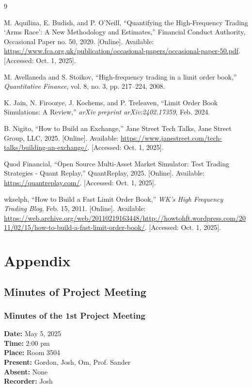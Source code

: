 \documentclass[12pt,a4paper]{article}
\begin{document}
\begin{thebibliography}{9}

M. Aquilina, E. Budish, and P. O’Neill, ``Quantifying the High-Frequency Trading `Arms Race': A New Methodology and Estimates,'' Financial Conduct Authority, Occasional Paper no. 50, 2020. [Online]. Available: \url{https://www.fca.org.uk/publication/occasional-papers/occasional-paper-50.pdf}. [Accessed: Oct. 1, 2025].

M. Avellaneda and S. Stoikov, ``High-frequency trading in a limit order book,'' \textit{Quantitative Finance}, vol. 8, no. 3, pp. 217--224, 2008.

K. Jain, N. Firoozye, J. Kochems, and P. Treleaven, ``Limit Order Book Simulations: A Review,'' \textit{arXiv preprint arXiv:2402.17359}, Feb. 2024.

B. Nigito, ``How to Build an Exchange,'' Jane Street Tech Talks, Jane Street Group, LLC, 2025. [Online]. Available: \url{https://www.janestreet.com/tech-talks/building-an-exchange/}. [Accessed: Oct. 1, 2025].

Quod Financial, ``Open Source Multi-Asset Market Simulator: Test Trading Strategies - Quant Replay,'' QuantReplay, 2025. [Online]. Available: \url{https://quantreplay.com/}. [Accessed: Oct. 1, 2025].

wkselph, ``How to Build a Fast Limit Order Book,'' \textit{WK's High Frequency Trading Blog}, Feb. 15, 2011. [Online]. Available: \url{https://web.archive.org/web/20110219163448/http://howtohft.wordpress.com/2011/02/15/how-to-build-a-fast-limit-order-book/}. [Accessed: Oct. 1, 2025].

\end{thebibliography}

\newpage
\section{Appendix}


\subsection{Minutes of Project Meeting}

\subsubsection{Minutes of the 1st Project Meeting}
\textbf{Date:} May 5, 2025\\
\textbf{Time:} 2:00 pm\\
\textbf{Place:} Room 3504\\
\textbf{Present:} Gordon, Josh, Om, Prof. Sander\\
\textbf{Absent:} None\\
\textbf{Recorder:} Josh
\end{document}
